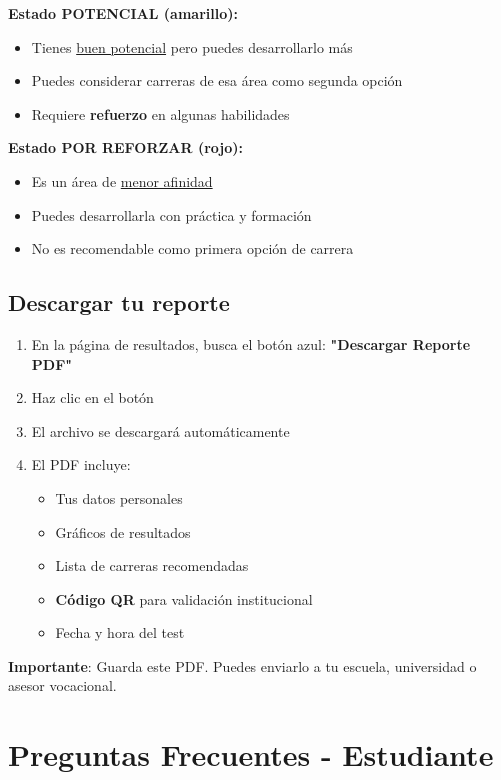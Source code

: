 \documentclass[12pt, a4paper]{report}
\begin{document}
\textbf{Estado POTENCIAL (amarillo):}
\begin{itemize}
    \item Tienes \underline{buen potencial} pero puedes desarrollarlo más
    \item Puedes considerar carreras de esa área como segunda opción
    \item Requiere \textbf{refuerzo} en algunas habilidades
\end{itemize}

\textbf{Estado POR REFORZAR (rojo):}
\begin{itemize}
    \item Es un área de \underline{menor afinidad}
    \item Puedes desarrollarla con práctica y formación
    \item No es recomendable como primera opción de carrera
\end{itemize}

\subsection{Descargar tu reporte}
\begin{enumerate}
    \item En la página de resultados, busca el botón azul: \textbf{"Descargar Reporte PDF"}
    \item Haz clic en el botón
    \item El archivo se descargará automáticamente
    \item El PDF incluye:
    \begin{itemize}
        \item Tus datos personales
        \item Gráficos de resultados
        \item Lista de carreras recomendadas
        \item \textbf{Código QR} para validación institucional
        \item Fecha y hora del test
    \end{itemize}
\end{enumerate}

\textbf{Importante}: Guarda este PDF. Puedes enviarlo a tu escuela, universidad o asesor vocacional.

\section{Preguntas Frecuentes - Estudiante}
\end{document}
